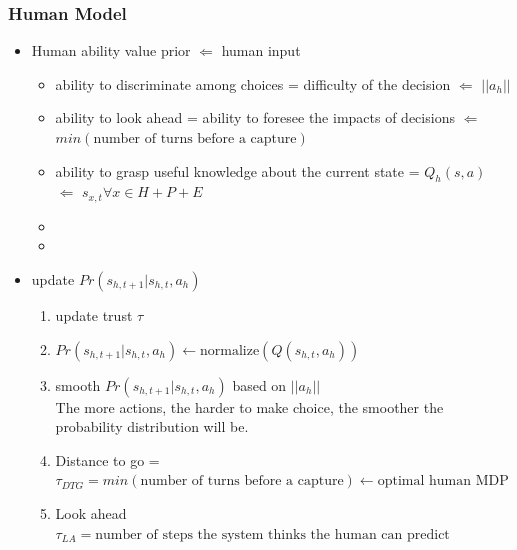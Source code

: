 \subsubsection{Human Model}
\begin{itemize}
    \item Human ability value prior $\Leftarrow$ human input
    \begin{itemize}
        \item ability to discriminate among choices = difficulty of the decision $\Leftarrow$ $||a_h||$
        \item ability to look ahead = ability to foresee the impacts of decisions $\Leftarrow$ $min(\text{number of turns before a capture})$
        \item ability to grasp useful knowledge about the current state = $Q_h(s,a)$ $\Leftarrow$ $s_{x,t} \forall x \in H+P+E$
        \item {}
        \item {}
    \end{itemize}

    \item update $Pr(s_{h,t+1} | s_{h,t}, a_h)$
    \begin{enumerate}
        \item update trust $\tau$
        \item $Pr(s_{h,t+1} | s_{h,t}, a_h) \leftarrow \text{normalize}(Q(s_{h,t}, a_h))$
        \item smooth $Pr(s_{h,t+1} | s_{h,t}, a_h)$ based on $||a_h||$\\
        The more actions, the harder to make choice, the smoother the probability distribution will be.
        \item Distance to go = $\tau_{DTG} = min(\text{number of turns before a capture}) \leftarrow \text{optimal human MDP}$
        \item Look ahead $\tau_{LA} = \text{number of steps the system thinks the human can predict}$
    \end{enumerate}
\end{itemize}

